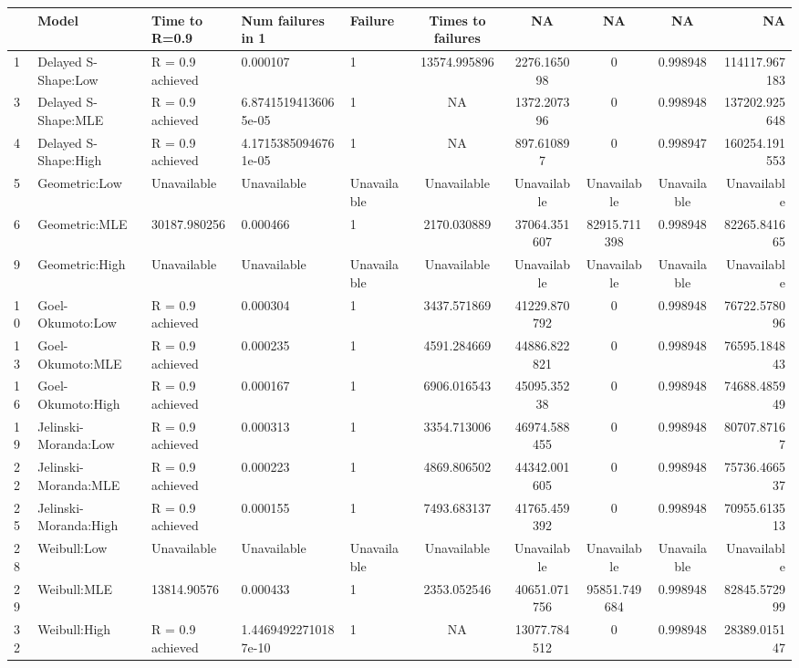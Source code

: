 \documentclass{report}\usepackage[]{graphicx}\usepackage[]{color}
\newenvironment{knitrout}{}{} %
\begin{document}
\begin{knitrout}
\color{fgcolor}
\begin{tabular}{l|l|l|l|l|c|c|c|c|r}
\hline
  & Model & Time to R=0.9 & Num failures in 1 & Failure & Times to failures & NA & NA & NA & NA\\
\hline
1 & Delayed S-Shape:Low & R = 0.9 achieved & 0.000107 & 1 & 13574.995896 & 2276.165098 & 0 & 0.998948 & 114117.967183\\
\hline
3 & Delayed S-Shape:MLE & R = 0.9 achieved & 6.87415194136065e-05 & 1 & NA & 1372.207396 & 0 & 0.998948 & 137202.925648\\
\hline
4 & Delayed S-Shape:High & R = 0.9 achieved & 4.17153850946761e-05 & 1 & NA & 897.610897 & 0 & 0.998947 & 160254.191553\\
\hline
5 & Geometric:Low & Unavailable & Unavailable & Unavailable & Unavailable & Unavailable & Unavailable & Unavailable & Unavailable\\
\hline
6 & Geometric:MLE & 30187.980256 & 0.000466 & 1 & 2170.030889 & 37064.351607 & 82915.711398 & 0.998948 & 82265.841665\\
\hline
9 & Geometric:High & Unavailable & Unavailable & Unavailable & Unavailable & Unavailable & Unavailable & Unavailable & Unavailable\\
\hline
10 & Goel-Okumoto:Low & R = 0.9 achieved & 0.000304 & 1 & 3437.571869 & 41229.870792 & 0 & 0.998948 & 76722.578096\\
\hline
13 & Goel-Okumoto:MLE & R = 0.9 achieved & 0.000235 & 1 & 4591.284669 & 44886.822821 & 0 & 0.998948 & 76595.184843\\
\hline
16 & Goel-Okumoto:High & R = 0.9 achieved & 0.000167 & 1 & 6906.016543 & 45095.35238 & 0 & 0.998948 & 74688.485949\\
\hline
19 & Jelinski-Moranda:Low & R = 0.9 achieved & 0.000313 & 1 & 3354.713006 & 46974.588455 & 0 & 0.998948 & 80707.87167\\
\hline
22 & Jelinski-Moranda:MLE & R = 0.9 achieved & 0.000223 & 1 & 4869.806502 & 44342.001605 & 0 & 0.998948 & 75736.466537\\
\hline
25 & Jelinski-Moranda:High & R = 0.9 achieved & 0.000155 & 1 & 7493.683137 & 41765.459392 & 0 & 0.998948 & 70955.613513\\
\hline
28 & Weibull:Low & Unavailable & Unavailable & Unavailable & Unavailable & Unavailable & Unavailable & Unavailable & Unavailable\\
\hline
29 & Weibull:MLE & 13814.90576 & 0.000433 & 1 & 2353.052546 & 40651.071756 & 95851.749684 & 0.998948 & 82845.572999\\
\hline
32 & Weibull:High & R = 0.9 achieved & 1.44694922710187e-10 & 1 & NA & 13077.784512 & 0 & 0.998948 & 28389.015147\\
\hline
\end{tabular}


\end{knitrout}
\end{document}
